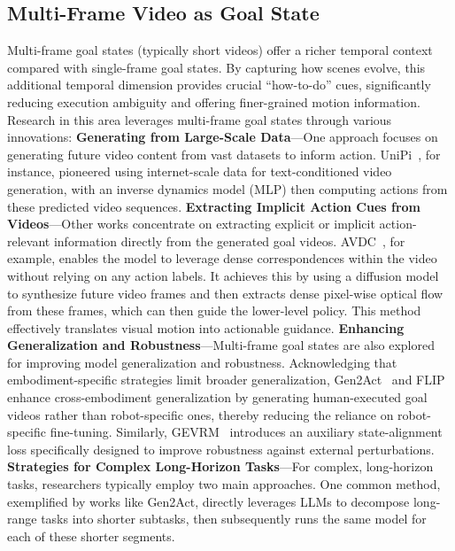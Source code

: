 \documentclass[10pt, a4paper, logo, copyright]{googledeepmind} %
\begin{document}
\subsection{Multi-Frame Video as Goal State}
Multi-frame goal states (typically short videos) offer a richer temporal context compared with single-frame goal states. By capturing how scenes evolve, this additional temporal dimension provides crucial ``how-to-do'' cues, significantly reducing execution ambiguity and offering finer-grained motion information. Research in this area leverages multi-frame goal states through various innovations: 
    \textbf{Generating from Large-Scale Data}---One approach focuses on generating future video content from vast datasets to inform action. UniPi~\cite{du2023learninguniversalpoliciestextguided}, for instance, pioneered using internet-scale data for text-conditioned video generation, with an inverse dynamics model (MLP) then computing actions from these predicted video sequences. 
    \textbf{Extracting Implicit Action Cues from Videos}---Other works concentrate on extracting explicit or implicit action-relevant information directly from the generated goal videos. AVDC~\cite{ko2023avdc}, for example, enables the model to leverage dense correspondences within the video without relying on any action labels. It achieves this by using a diffusion model to synthesize future video frames and then extracts dense pixel-wise optical flow from these frames, which can then guide the lower-level policy. This method effectively translates visual motion into actionable guidance. 
    \textbf{Enhancing Generalization and Robustness}---Multi-frame goal states are also explored for improving model generalization and robustness. Acknowledging that embodiment-specific strategies limit broader generalization, Gen2Act~\cite{bharadhwaj2024gen2acthumanvideogeneration} and FLIP~\cite{flip} enhance cross-embodiment generalization by generating human-executed goal videos rather than robot-specific ones, thereby reducing the reliance on robot-specific fine-tuning. Similarly, GEVRM~\cite{zhang2025gevrmgoalexpressivevideogeneration} introduces an auxiliary state-alignment loss specifically designed to improve robustness against external perturbations. 
    \textbf{Strategies for Complex Long-Horizon Tasks}---For complex, long-horizon tasks, researchers typically employ two main approaches. One common method, exemplified by works like Gen2Act, directly leverages LLMs to decompose long-range tasks into shorter subtasks, then subsequently runs the same model for each of these shorter segments.
\end{document}
